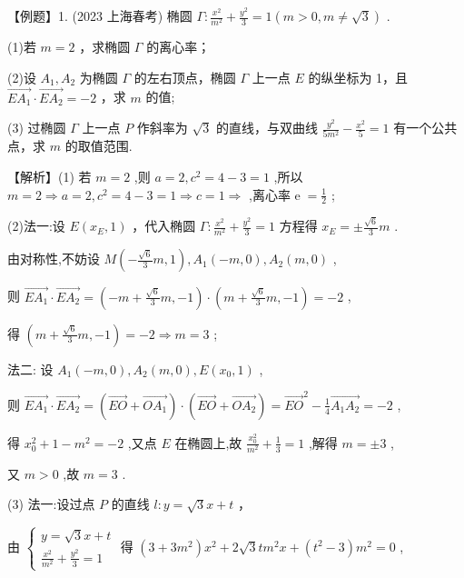 \documentclass[10pt]{article}
\begin{document}
【例题】1. (2023 上海春考) 椭圆 \(\Gamma  : \frac{{x}^{2}}{{m}^{2}} + \frac{{y}^{2}}{3} = 1\left( {m > 0,m \neq  \sqrt{3}}\right)\) .

(1)若 \(m = 2\) ，求椭圆 \(\Gamma\) 的离心率；

(2)设 \({A}_{1},{A}_{2}\) 为椭圆 \(\Gamma\) 的左右顶点，椭圆 \(\Gamma\) 上一点 \(E\) 的纵坐标为 1，且 \(\overrightarrow{E{A}_{1}} \cdot  \overrightarrow{E{A}_{2}} =  - 2\) ，求 \(m\) 的值;

(3) 过椭圆 \(\Gamma\) 上一点 \(P\) 作斜率为 \(\sqrt{3}\) 的直线，与双曲线 \(\frac{{y}^{2}}{5{m}^{2}} - \frac{{x}^{2}}{5} = 1\) 有一个公共点，求 \(m\) 的取值范围.

【解析】(1) 若 \(m = 2\) ,则 \(a = 2,{c}^{2} = 4 - 3 = 1\) ,所以 \(m = 2 \Rightarrow  a = 2,{c}^{2} = 4 - 3 = 1 \Rightarrow  c = 1 \Rightarrow\) ,离心率 \(\mathrm{e} \; = \frac{1}{2}\) ;

(2)法一:设 \(E\left( {{x}_{E},1}\right)\) ，代入椭圆 \(\Gamma  : \frac{{x}^{2}}{{m}^{2}} + \frac{{y}^{2}}{3} = 1\) 方程得 \({x}_{E} =  \pm  \frac{\sqrt{6}}{3}m\) .

由对称性,不妨设 \(M\left( {-\frac{\sqrt{6}}{3}m,1}\right) ,{A}_{1}\left( {-m,0}\right) ,{A}_{2}\left( {m,0}\right)\) ,

则 \(\overrightarrow{E{A}_{1}} \cdot  \overrightarrow{E{A}_{2}} = \left( {-m + \frac{\sqrt{6}}{3}m, - 1}\right)  \cdot  \left( {m + \frac{\sqrt{6}}{3}m, - 1}\right)  =  - 2\) ,

得 \(\left( {m + \frac{\sqrt{6}}{3}m, - 1}\right)  =  - 2 \Rightarrow  m = 3\) ;

法二: 设 \({A}_{1}\left( {-m,0}\right) ,{A}_{2}\left( {m,0}\right) ,E\left( {{x}_{0},1}\right)\) ,

则 \(\overrightarrow{E{A}_{1}} \cdot  \overrightarrow{E{A}_{2}} = \left( {\overrightarrow{EO} + \overrightarrow{O{A}_{1}}}\right)  \cdot  \left( {\overrightarrow{EO} + \overrightarrow{O{A}_{2}}}\right)  = {\overrightarrow{EO}}^{2} - \frac{1}{4}\overrightarrow{{A}_{1}{A}_{2}} =  - 2\) ,

得 \({x}_{0}^{2} + 1 - {m}^{2} =  - 2\) ,又点 \(E\) 在椭圆上,故 \(\frac{{x}_{0}^{2}}{{m}^{2}} + \frac{1}{3} = 1\) ,解得 \(m =  \pm  3\) ,

又 \(m > 0\) ,故 \(m = 3\) .

(3) 法一:设过点 \(P\) 的直线 \(l : y = \sqrt{3}x + t\) ，

由 \(\left\{  \begin{array}{l} y = \sqrt{3}x + t \\  \frac{{x}^{2}}{{m}^{2}} + \frac{{y}^{2}}{3} = 1 \end{array}\right.\) 得 \(\left( {3 + 3{m}^{2}}\right) {x}^{2} + 2\sqrt{3}t{m}^{2}x + \left( {{t}^{2} - 3}\right) {m}^{2} = 0\) ,
\end{document}
